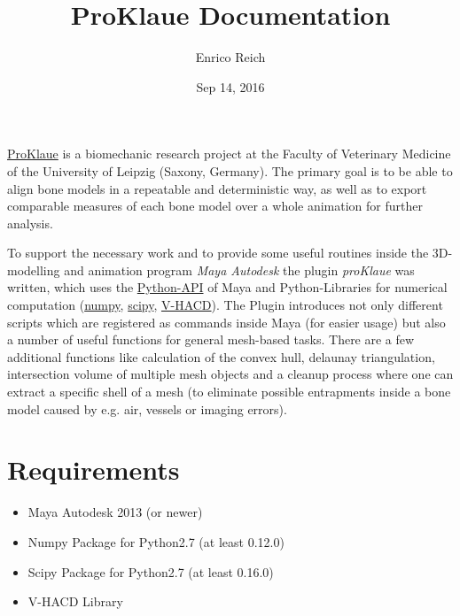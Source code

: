 \documentclass[letterpaper,10pt,english]{sphinxmanual}
\title{ProKlaue Documentation}
\date{Sep 14, 2016}
\author{Enrico Reich}
\begin{document}
\maketitle
\tableofcontents
{}\label{index::doc}

\label{index:module-proKlaue}
\href{http://www.zv.uni-leipzig.de/service/kommunikation/medienredaktion/nachrichten.html?ifab\_modus=detail\&ifab\_id=6004}{ProKlaue} is a biomechanic research project at the Faculty of Veterinary Medicine of the University of Leipzig (Saxony, Germany). The primary goal is to be able to align bone models in a repeatable and deterministic way, as well as to export comparable measures of each bone model over a whole animation for further analysis.

To support the necessary work and to provide some useful routines inside the 3D-modelling and animation program \emph{Maya Autodesk} the plugin \emph{proKlaue} was written, which uses the \href{http://download.autodesk.com/us/maya/2011help/CommandsPython/}{Python-API} of Maya and Python-Libraries for numerical computation (\href{http://www.numpy.org/}{numpy}, \href{https://www.scipy.org/}{scipy}, \href{https://github.com/kmammou/v-hacd}{V-HACD}). The Plugin introduces not only different scripts which are registered as commands inside Maya (for easier usage) but also a number of useful functions for general mesh-based tasks. There are a few additional functions like calculation of the convex hull, delaunay triangulation, intersection volume of multiple mesh objects and a cleanup process where one can extract a specific shell of a mesh (to eliminate possible entrapments inside a bone model caused by e.g. air, vessels or imaging errors).


\chapter{Requirements}
\label{index:welcome-to-proklaue-s-documentation}\label{index:main}\label{index:requirements}\label{index:module-proKlaue}\begin{itemize}
\item {} 
Maya Autodesk 2013 (or newer)

\item {} 
Numpy Package for Python2.7 (at least 0.12.0)

\item {} 
Scipy Package for Python2.7 (at least 0.16.0)

\item {} 
V-HACD Library

\end{itemize}
\end{document}
